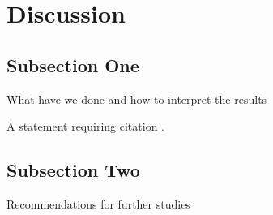 \section{Discussion}
	
\subsection{Subsection One}

What have we done and how to interpret the results

A statement requiring citation \cite{Figueredo:2009dg}.
\blindtext %

\subsection{Subsection Two}

Recommendations for further studies

\blindtext %